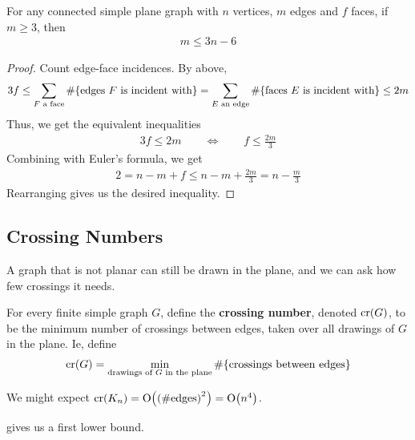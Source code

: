 \begin{boxproposition} \label{Ch7:Prop:Planar_Edge_Bound}
    For any connected simple plane graph with $n$ vertices, $m$ edges and $f$ faces, if $m \geq 3$, then
    \begin{align*}
        m \leq 3n - 6
    \end{align*}
\end{boxproposition}
\begin{proof}
    Count edge-face incidences. By above,
    \begin{align*}
        3f \leq \sum_{F \text{ a face}} \#\!\left\{ \text{edges $F$ is incident with} \right\} = \sum_{E \text{ an edge}} \#\!\left\{ \text{faces $E$ is incident with} \right\} \leq 2m
    \end{align*}
    Thus, we get the equivalent inequalities
    \begin{align*}
        3f \leq 2m \qquad \iff  \qquad f \leq \frac{2m}{3}
    \end{align*}
    Combining with Euler's formula, we get
    \begin{align*}
        2
        = n - m + f
        \leq n - m + \frac{2m}{3}
        = n - \frac{m}{3}
    \end{align*}
    Rearranging gives us the desired inequality.
\end{proof}

\subsection{Crossing Numbers}

A graph that is not planar can still be drawn in the plane, and we can ask how few crossings it needs.

\begin{boxdefinition}
    For every finite simple graph $G$, define the \textbf{crossing number}, denoted $\operatorname{cr}\!\left( G \right)$, to be the minimum number of crossings between edges, taken over all drawings of $G$ in the plane. Ie, define
    \begin{align*}
        \operatorname{cr}\!\left( G \right) = \min_{\text{drawings of $G$ in the plane}} \#\!\left\{ \text{crossings between edges} \right\}
    \end{align*}
\end{boxdefinition}

We might expect $\operatorname{cr}\!\left( K_n \right) = \operatorname{O}\!\left( \left( \#\text{edges} \right)^2 \right) = \operatorname{O}\!\left( n^4 \right)$.

 gives us a first lower bound.

